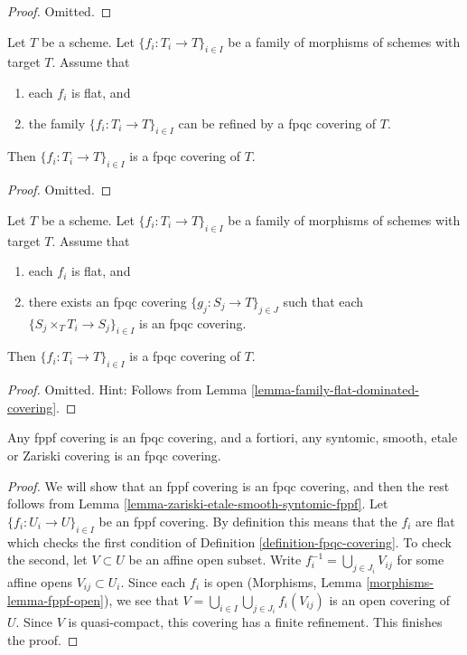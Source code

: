 \begin{proof}
Omitted.
\end{proof}

\begin{lemma}
\label{lemma-family-flat-dominated-covering}
Let $T$ be a scheme. Let $\{f_i : T_i \to T\}_{i \in I}$ be a family of
morphisms of schemes with target $T$. Assume that
\begin{enumerate}
\item each $f_i$ is flat, and
\item the family $\{f_i : T_i \to T\}_{i \in I}$ can be refined by a
fpqc covering of $T$.
\end{enumerate}
Then $\{f_i : T_i \to T\}_{i \in I}$ is a fpqc covering of $T$.
\end{lemma}

\begin{proof}
Omitted.
\end{proof}

\begin{lemma}
\label{lemma-family-flat-fpqc-local-covering}
Let $T$ be a scheme. Let $\{f_i : T_i \to T\}_{i \in I}$ be a family of
morphisms of schemes with target $T$. Assume that
\begin{enumerate}
\item each $f_i$ is flat, and
\item there exists an fpqc covering
$\{g_j : S_j \to T\}_{j \in J}$ such that each
$\{S_j \times_T T_i \to S_j\}_{i \in I}$ is an fpqc covering.
\end{enumerate}
Then $\{f_i : T_i \to T\}_{i \in I}$ is a fpqc covering of $T$.
\end{lemma}

\begin{proof}
Omitted. Hint: Follows from Lemma \ref{lemma-family-flat-dominated-covering}.
\end{proof}

\begin{lemma}
\label{lemma-zariski-etale-smooth-syntomic-fppf-fpqc}
Any fppf covering is an fpqc covering, and a fortiori,
any syntomic, smooth, etale or Zariski covering is an fpqc covering.
\end{lemma}

\begin{proof}
We will show that an fppf covering is an fpqc covering, and then the
rest follows from
Lemma \ref{lemma-zariski-etale-smooth-syntomic-fppf}.
Let $\{f_i : U_i \to U\}_{i \in I}$ be an fppf covering.
By definition this means that the $f_i$ are flat which checks the first
condition of Definition \ref{definition-fpqc-covering}. To check the
second, let $V \subset U$ be an affine open subset.
Write $f_i^{-1} = \bigcup_{j \in J_i} V_{ij}$
for some affine opens $V_{ij} \subset U_i$. Since each $f_i$ is open
(Morphisms, Lemma \ref{morphisms-lemma-fppf-open}), we see that
$V = \bigcup_{i\in I} \bigcup_{j \in J_i} f_i(V_{ij})$
is an open covering of $U$.
Since $V$ is quasi-compact, this covering has a finite
refinement. This finishes the proof.
\end{proof}

